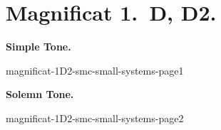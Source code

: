 {
\cleartoleftpage{}
\thispagestyle{empty}
\newcommand{\printsimpletone}{
\needspace{3\baselineskip}
\begin{center}\textbf{Simple Tone.}\end{center}
\vspace{0ex plus 0ex minus 2ex}
}
\newcommand{\printsolemntone}{
\needspace{3\baselineskip}
\begin{center}\textbf{Solemn Tone.}\end{center}
\vspace{0ex plus 0ex minus 1ex}
}

\label{magnificat-1D}
\vspace*{-\headheight}
\vspace*{-0.5\baselineskip}
\section{Magnificat 1.~D, D2.}

\vspace{-\baselineskip}
\def\betweenLilyPondSystem#1{
  \ifnum#1>1
    \vfil\noindent
  \else
    \linebreak
  \fi
}
\newcommand{\includelilypond}[1]{
  \noindent
  {#1}
}
\def\magsolemn{F}
\def\magsmc{T}
\def\annot{\magtone.~\magend}
\printsimpletone{}
\begin{oddversesmagnificat}{\magtex}
\magverses
\end{oddversesmagnificat}


\vfill
\includelilypond{magnificat-1D2-smc-small-systems-page1}
\pagebreak


\def\magsolemn{T}
\let\magant=\undefined
\let\magantlinetwo=\undefined
\let\magtex=\undefined
\let\magverses=\undefined
\def\magsmc{T}
\def\annot{\magtone.~\magend}
\printsolemntone{}
\begin{oddversesmagnificat}{\magtex}
\magverses
\end{oddversesmagnificat}


\vfill
\includelilypond{magnificat-1D2-smc-small-systems-page2}
}